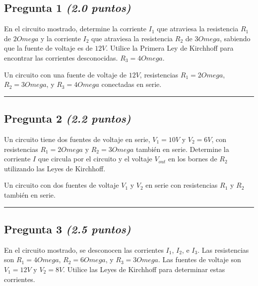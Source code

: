 \documentclass[11pt,a4paper]{article}
\begin{document}
\subsection*{Pregunta 1 \normalfont\normalsize\textit{(2.0 puntos)}}
En el circuito mostrado, determine la corriente $I_1$ que atraviesa la resistencia $R_1$ de $2Omega$ y la corriente $I_2$ que atraviesa la resistencia $R_2$ de $3Omega$, sabiendo que la fuente de voltaje es de $12V$. Utilice la Primera Ley de Kirchhoff para encontrar las corrientes desconocidas. $R_3 = 4Omega$.

  \begin{tcolorbox}[colback=gray!5, colframe=gray!40, fonttitle=\bfseries, title={Diagrama sugerido}]
    Un circuito con una fuente de voltaje de $12V$, resistencias $R_1 = 2Omega$, $R_2 = 3Omega$, y $R_3 = 4Omega$ conectadas en serie.
  \end{tcolorbox}

\vspace{2mm}
\rule{\linewidth}{0.2pt}
\vspace{3cm}  %



\subsection*{Pregunta 2 \normalfont\normalsize\textit{(2.2 puntos)}}
Un circuito tiene dos fuentes de voltaje en serie, $V_1 = 10V$ y $V_2 = 6V$, con resistencias $R_1 = 2Omega$ y $R_2 = 3Omega$ también en serie. Determine la corriente $I$ que circula por el circuito y el voltaje $V_{out}$ en los bornes de $R_2$ utilizando las Leyes de Kirchhoff.

  \begin{tcolorbox}[colback=gray!5, colframe=gray!40, fonttitle=\bfseries, title={Diagrama sugerido}]
    Un circuito con dos fuentes de voltaje $V_1$ y $V_2$ en serie con resistencias $R_1$ y $R_2$ también en serie.
  \end{tcolorbox}

\vspace{2mm}
\rule{\linewidth}{0.2pt}
\vspace{3cm}  %



\subsection*{Pregunta 3 \normalfont\normalsize\textit{(2.5 puntos)}}
En el circuito mostrado, se desconocen las corrientes $I_1$, $I_2$, e $I_3$. Las resistencias son $R_1 = 4Omega$, $R_2 = 6Omega$, y $R_3 = 3Omega$. Las fuentes de voltaje son $V_1 = 12V$ y $V_2 = 8V$. Utilice las Leyes de Kirchhoff para determinar estas corrientes.
\end{document}
